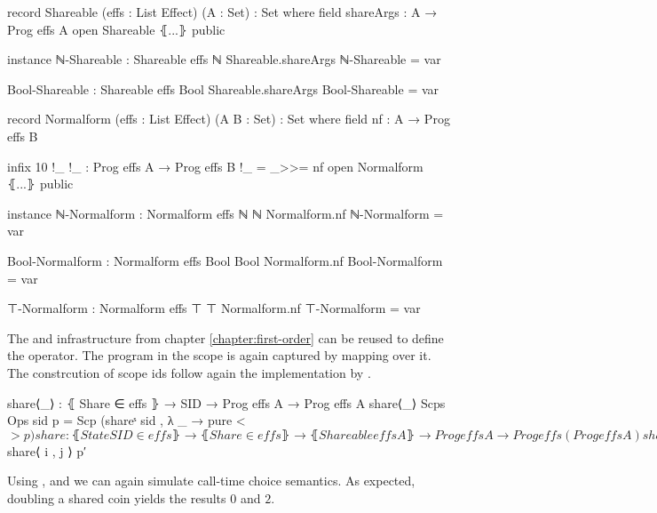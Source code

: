 \begin{code}[hide]
record Shareable (effs : List Effect) (A : Set) : Set where
  field
    shareArgs : A → Prog effs A
open Shareable ⦃...⦄ public

instance
  ℕ-Shareable : Shareable effs ℕ
  Shareable.shareArgs ℕ-Shareable = var

  Bool-Shareable : Shareable effs Bool
  Shareable.shareArgs Bool-Shareable = var

record Normalform (effs : List Effect) (A B : Set) : Set where
  field
    nf : A → Prog effs B

  infix 10 !_
  !_ : Prog effs A → Prog effs B
  !_ = _>>= nf
open Normalform ⦃...⦄ public

instance
  ℕ-Normalform : Normalform effs ℕ ℕ
  Normalform.nf ℕ-Normalform = var

  Bool-Normalform : Normalform effs Bool Bool
  Normalform.nf Bool-Normalform = var

  ⊤-Normalform : Normalform effs ⊤ ⊤
  Normalform.nf ⊤-Normalform = var
\end{code}

The  and  infrastructure from
chapter \ref{chapter:first-order} can be reused to define the
 operator.
The program in the scope is again captured by mapping  over it.
The constrcution of scope ids follow again the implementation by
\textcite{bunkenburg2019modeling}.

\begin{code}
share⟨_⟩ : ⦃ Share ∈ effs ⦄ → SID → Prog effs A → Prog effs A
share⟨_⟩ {Scps} {Ops} sid p = Scp (shareˢ sid , λ _ → pure <$> p)

share : ⦃ State SID ∈ effs ⦄ → ⦃ Share ∈ effs ⦄ → ⦃ Shareable effs A ⦄ →
  Prog effs A → Prog effs (Prog effs A)
share {Ops} {Scps} p = do
    (i , j) ← get
    put (i + 1 , j)
    let p′ = do
          put (i , j + 1)
          x  ← p
          x′ ← shareArgs x
          put (i + 1 , j)
          pure x′
    pure $ share⟨ i , j ⟩ p′
    
\end{code}
Using ,  and  we
can again simulate call-time choice semantics.
As expected, doubling a shared coin yields the results $0$ and $2$.

